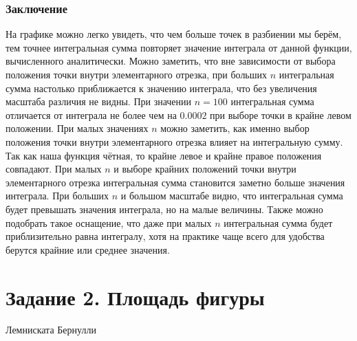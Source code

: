 \documentclass{article}
\begin{document}
\subsubsection*{Заключение}

\quad На графике можно легко увидеть, что чем больше точек в разбиении мы берём, тем точнее интегральная сумма повторяет значение интеграла от данной функции, вычисленного аналитически. Можно заметить, что вне зависимости от выбора положения точки внутри элементарного отрезка, при больших $n$ интегральная сумма настолько приближается к значению интеграла, что без увеличения масштаба различия не видны. При значении $n=100$ интегральная сумма отличается от интеграла не более чем на $0.0002$ при выборе точки в крайне левом положении. При малых значениях $n$ можно заметить, как именно выбор положения точки внутри элементарного отрезка влияет на интегральную сумму. Так как наша функция чётная, то крайне левое и крайне правое положения совпадают. При малых $n$ и выборе крайних положений точки внутри элементарного отрезка интегральная сумма становится заметно больше значения интеграла. При больших $n$ и большом масштабе видно, что интегральная сумма будет превышать значения интеграла, но на малые величины. Также можно подобрать такое оснащение, что даже при малых $n$ интегральная сумма будет приблизительно равна интегралу, хотя на практике чаще всего для удобства берутся крайние или среднее значения.

\newpage

\section{Задание 2. Площадь фигуры}

\begin{center}
    
    \caption{Лемниската Бернулли}
    \label{fig:task2}
\end{center}
\end{document}
